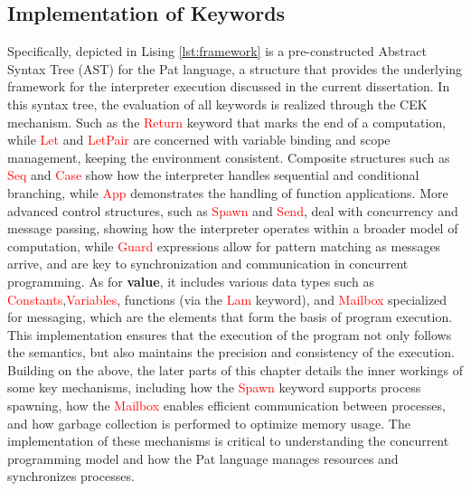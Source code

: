 \documentclass{l4proj}
\begin{document}
\subsection{Implementation of Keywords}
Specifically, depicted in  Lising \ref{lst:framework} is a pre-constructed Abstract Syntax Tree (AST) for the Pat language, a structure that provides the underlying framework for the interpreter execution discussed in the current dissertation. In this syntax tree, the evaluation of all keywords is realized through the CEK mechanism. Such as the \textcolor{red}{Return} keyword that marks the end of a computation, while \textcolor{red}{Let} and \textcolor{red}{LetPair} are concerned with variable binding and scope management, keeping the environment consistent. Composite structures such as \textcolor{red}{Seq} and \textcolor{red}{Case} show how the interpreter handles sequential and conditional branching, while \textcolor{red}{App} demonstrates the handling of function applications. More advanced control structures, such as \textcolor{red}{Spawn} and \textcolor{red}{Send}, deal with concurrency and message passing, showing how the interpreter operates within a broader model of computation, while \textcolor{red}{Guard} expressions allow for pattern matching as messages arrive, and are key to synchronization and communication in concurrent programming. As for \textbf{value}, it includes various data types such as \textcolor{red}{Constants},\textcolor{red}{Variables}, functions (via the \textcolor{red}{Lam} keyword), and \textcolor{red}{Mailbox} specialized for messaging, which are the elements that form the basis of program execution. This implementation ensures that the execution of the program not only follows the semantics, but also maintains the precision and consistency of the execution. Building on the above, the later parts of this chapter details the inner workings of some key mechanisms, including how the \textcolor{red}{Spawn} keyword supports process spawning, how the \textcolor{red}{Mailbox} enables efficient communication between processes, and how garbage collection is performed to optimize memory usage. The implementation of these mechanisms is critical to understanding the concurrent programming model and how the Pat language manages resources and synchronizes processes.
\end{document}
